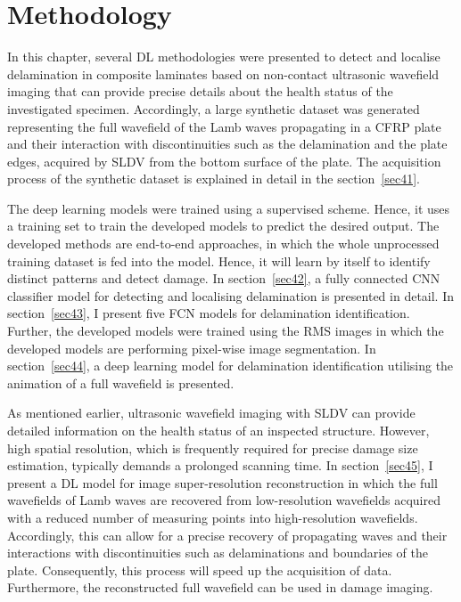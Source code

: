 \chapter[Methodology]{Methodology}
\label{ch4}

In this chapter, several DL methodologies were presented to detect and localise delamin\-ation in composite laminates based on non-contact ultrasonic wavefield imaging that can provide precise details about the health status of the investigated specimen.
Accor\-dingly, a large synthetic dataset was generated representing the full wavefield of the Lamb waves propagating in a CFRP plate and their interaction with discontinuities such as the delamination and the plate edges, acquired by SLDV from the bottom surface of the plate.
The acquisition process of the synthetic dataset is explained in detail in the section~\ref{sec41}.

The deep learning models were trained using a supervised scheme. 
Hence, it uses a training set to train the developed models to predict the desired output.
The developed methods are end-to-end approaches, in which the whole unprocessed training dataset is fed into the model.
Hence, it will learn by itself to identify distinct patterns and detect damage.
In section~\ref{sec42}, a fully connected CNN classifier model for detecting and localising delamination is presented in detail.
In section~\ref{sec43}, I present five FCN models for delamination identification. 
Further, the developed models were trained using the RMS images in which the developed models are performing pixel-wise image segmentation.
In section~\ref{sec44}, a deep learning model for delamination identification utilising the animation of a full wavefield is presented.

As mentioned earlier, ultrasonic wavefield imaging with SLDV can provide detailed information on the health status of an inspected structure.
However, high spatial resolution, which is frequently required for precise damage size estimation, typically demands a prolonged scanning time.
In section~\ref{sec45}, I present a DL model for image super-resolution reconstruction in which the full wavefields of Lamb waves are recovered from low-resolution wavefields acquired with a reduced number of measuring points into high-resolution wavefields.
Accordingly, this can allow for a precise recovery of propagating waves and their interactions with discontinuities such as delaminations and boundaries of the plate.
Consequently, this process will speed up the acquisition of data.
Furthermore, the reconstructed full wavefield can be used in damage imaging. 

